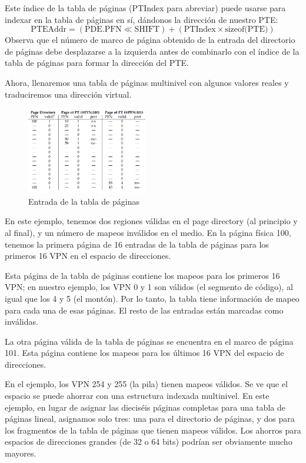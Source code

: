 \documentclass{article}
\begin{document}
Este índice de la tabla de páginas (PTIndex para abreviar) puede usarse para indexar en la tabla de páginas en sí, dándonos la dirección de nuestro PTE:
\begin{equation*}
    \text{PTEAddr} = (\text{PDE.PFN} \ll \text{SHIFT}) + (\text{PTIndex} \times \text{sizeof(PTE)})
\end{equation*}
Observa que el número de marco de página obtenido de la entrada del directorio de páginas debe desplazarse a la izquierda antes de combinarlo con el índice de la tabla de páginas para formar la dirección del PTE.

Ahora, llenaremos una tabla de páginas multinivel con algunos valores reales y traduciremos una dirección virtual.

\begin{figure}[h]
    \centering
    \includegraphics[width=0.47\textwidth]{src/pte3.png}
    \caption{Entrada de la tabla de páginas}
\end{figure}

En este ejemplo, tenemos dos regiones válidas en el page directory (al principio y al final), y un número de mapeos inválidos en el medio. En la página física 100, tenemos la primera página de 16 entradas de la tabla de páginas para los primeros 16 VPN en el espacio de direcciones.

Esta página de la tabla de páginas contiene los mapeos para los primeros 16 VPN; en nuestro ejemplo, los VPN 0 y 1 son válidos (el segmento de código), al igual que los 4 y 5 (el montón). Por lo tanto, la tabla tiene información de mapeo para cada una de esas páginas. El resto de las entradas están marcadas como inválidas.

La otra página válida de la tabla de páginas se encuentra en el marco de página 101. Esta página contiene los mapeos para los últimos 16 VPN del espacio de direcciones.

En el ejemplo, los VPN 254 y 255 (la pila) tienen mapeos válidos. Se ve que el espacio se puede ahorrar con una estructura indexada multinivel. En este ejemplo, en lugar de asignar las dieciséis páginas completas para una tabla de páginas lineal, asignamos solo tres: una para el directorio de páginas, y dos para los fragmentos de la tabla de páginas que tienen mapeos válidos. Los ahorros para espacios de direcciones grandes (de 32 o 64 bits) podrían ser obviamente mucho mayores.
\end{document}
